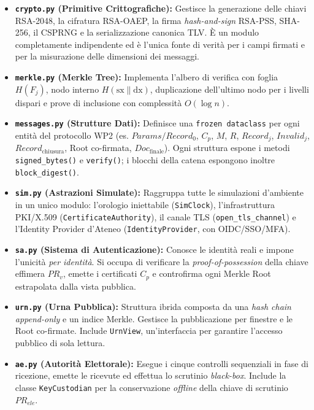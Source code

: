 \begin{itemize}
  \item \textbf{\texttt{crypto.py} (Primitive Crittografiche):} Gestisce la generazione delle chiavi RSA-2048, la cifratura RSA-OAEP, la firma \emph{hash-and-sign} RSA-PSS, SHA-256, il CSPRNG e la serializzazione canonica TLV. È un modulo completamente indipendente ed è l'unica fonte di verità per i campi firmati e per la misurazione delle dimensioni dei messaggi.
  
  \item \textbf{\texttt{merkle.py} (Merkle Tree):} Implementa l'albero di verifica con foglia $H(F_j)$, nodo interno $H(\text{sx}\|\text{dx})$, duplicazione dell'ultimo nodo per i livelli dispari e prove di inclusione con complessità $O(\log n)$.
  
  \item \textbf{\texttt{messages.py} (Strutture Dati):} Definisce una \texttt{frozen dataclass} per ogni entità del protocollo WP2 (es. $\mathit{Params}/\mathit{Record}_0$, $C_p$, $M$, $R$, $\mathit{Record}_j$, $\mathit{Invalid}_j$, $\mathit{Record}_{\text{chiusura}}$, Root co-firmata, $\mathit{Doc}_{\text{finale}}$). Ogni struttura espone i metodi \texttt{signed\_bytes()} e \texttt{verify()}; i blocchi della catena espongono inoltre \texttt{block\_digest()}.
  
  \item \textbf{\texttt{sim.py} (Astrazioni Simulate):} Raggruppa tutte le simulazioni d'ambiente in un unico modulo: l'orologio iniettabile (\texttt{SimClock}), l'infrastruttura PKI/X.509 (\texttt{CertificateAuthority}), il canale TLS (\texttt{open\_tls\_channel}) e l'Identity Provider d'Ateneo (\texttt{IdentityProvider}, con OIDC/SSO/MFA).
  
  \item \textbf{\texttt{sa.py} (Sistema di Autenticazione):} Conosce le identità reali e impone l'unicità \emph{per identità}. Si occupa di verificare la \emph{proof-of-possession} della chiave effimera $PR_v$, emette i certificati $C_p$ e controfirma ogni Merkle Root estrapolata dalla vista pubblica.
  
  \item \textbf{\texttt{urn.py} (Urna Pubblica):} Struttura ibrida composta da una \emph{hash chain append-only} e un indice Merkle. Gestisce la pubblicazione per finestre e le Root co-firmate. Include \texttt{UrnView}, un'interfaccia per garantire l'accesso pubblico di sola lettura.
  
  \item \textbf{\texttt{ae.py} (Autorità Elettorale):} Esegue i cinque controlli sequenziali in fase di ricezione, emette le ricevute ed effettua lo scrutinio \emph{black-box}. Include la classe \texttt{KeyCustodian} per la conservazione \emph{offline} della chiave di scrutinio $PR_{ele}$.
  

\end{itemize}
